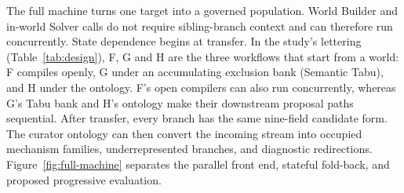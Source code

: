 \documentclass[11pt,a4paper]{article}
\begin{document}
The full machine turns one target into a governed population. World Builder and in-world Solver calls do not require sibling-branch context and can therefore run concurrently. State dependence begins at transfer. In the study's lettering (Table~\ref{tab:design}), F, G and H are the three workflows that start from a world: F compiles openly, G under an accumulating exclusion bank (Semantic Tabu), and H under the ontology. F's open compilers can also run concurrently, whereas G's Tabu bank and H's ontology make their downstream proposal paths sequential. After transfer, every branch has the same nine-field candidate form. The curator ontology can then convert the incoming stream into occupied mechanism families, underrepresented branches, and diagnostic redirections. Figure~\ref{fig:full-machine} separates the parallel front end, stateful fold-back, and proposed progressive evaluation.
\end{document}
